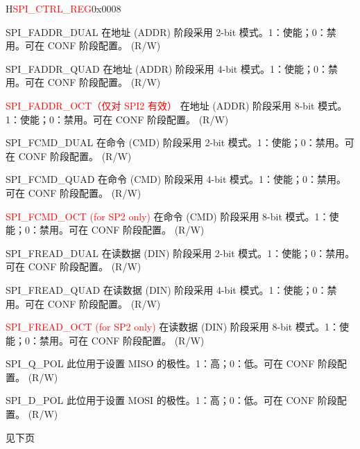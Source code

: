 \begin{register}{H}{\textcolor{red}{SPI\_CTRL\_REG}}{0x{}0008}
\begin{regdesc}
\begin{reglist}
\label{fielddesc:SPIFADDRDUAL}\item [SPI\_FADDR\_DUAL] 在地址 (ADDR) 阶段采用 2-bit 模式。1：使能；0：禁用。可在 CONF 阶段配置。 (R/W)
\label{fielddesc:SPIFADDRQUAD}\item [SPI\_FADDR\_QUAD] 在地址 (ADDR) 阶段采用 4-bit 模式。1：使能；0：禁用。可在 CONF 阶段配置。 (R/W)
\label{fielddesc:SPIFADDROCT}\item [\textcolor{red}{SPI\_FADDR\_OCT（仅对 SPI2 有效）}] 在地址 (ADDR) 阶段采用 8-bit 模式。1：使能；0：禁用。可在 CONF 阶段配置。 (R/W)
\label{fielddesc:SPIFCMDDUAL}\item [SPI\_FCMD\_DUAL] 在命令 (CMD) 阶段采用 2-bit 模式。1：使能；0：禁用。可在 CONF 阶段配置。 (R/W)
\label{fielddesc:SPIFCMDQUAD}\item [SPI\_FCMD\_QUAD] 在命令 (CMD) 阶段采用 4-bit 模式。1：使能；0：禁用。可在 CONF 阶段配置。 (R/W)
\label{fielddesc:SPIFCMDOCT}\item [\textcolor{red}{SPI\_FCMD\_OCT (for SP2 only)}] 在命令 (CMD) 阶段采用 8-bit 模式。1：使能；0：禁用。可在 CONF 阶段配置。 (R/W)
\label{fielddesc:SPIFREADDUAL}\item [SPI\_FREAD\_DUAL] 在读数据 (DIN) 阶段采用 2-bit 模式。1：使能；0：禁用。可在 CONF 阶段配置。 (R/W)
\label{fielddesc:SPIFREADQUAD}\item [SPI\_FREAD\_QUAD] 在读数据 (DIN) 阶段采用 4-bit 模式。1：使能；0：禁用。可在 CONF 阶段配置。 (R/W)
\label{fielddesc:SPIFREADOCT}\item [\textcolor{red}{SPI\_FREAD\_OCT (for SP2 only)}] 在读数据 (DIN) 阶段采用 8-bit 模式。1：使能；0：禁用。可在 CONF 阶段配置。 (R/W)
\label{fielddesc:SPIQPOL}\item [SPI\_Q\_POL] 此位用于设置 MISO 的极性。1：高；0：低。可在 CONF 阶段配置。 (R/W)
\label{fielddesc:SPIDPOL}\item [SPI\_D\_POL] 此位用于设置 MOSI 的极性。1：高；0：低。可在 CONF 阶段配置。 (R/W)

\item [见下页]
\end{reglist}\end{regdesc}
\end{register}

